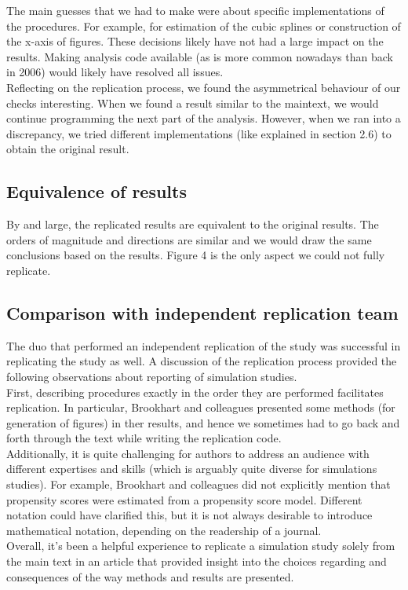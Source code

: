\documentclass[10,a4paperpaper,]{article}
\begin{document}
The main guesses that we had to make were about specific implementations
of the procedures. For example, for estimation of the cubic splines or
construction of the x-axis of figures. These decisions likely have not
had a large impact on the results. Making analysis code available (as is
more common nowadays than back in 2006) would likely have resolved all
issues.\\
Reflecting on the replication process, we found the asymmetrical
behaviour of our checks interesting. When we found a result similar to
the maintext, we would continue programming the next part of the
analysis. However, when we ran into a discrepancy, we tried different
implementations (like explained in section 2.6) to obtain the original
result.

\subsection{Equivalence of results}

By and large, the replicated results are equivalent to the original
results. The orders of magnitude and directions are similar and we would
draw the same conclusions based on the results. Figure 4 is the only
aspect we could not fully replicate.

\subsection{Comparison with independent replication team}

The duo that performed an independent replication of the study was
successful in replicating the study as well. A discussion of the
replication process provided the following observations about reporting
of simulation studies.\\
First, describing procedures exactly in the order they are performed
facilitates replication. In particular, Brookhart and colleagues
presented some methods (for generation of figures) in ther results, and
hence we sometimes had to go back and forth through the text while
writing the replication code.\\
Additionally, it is quite challenging for authors to address an audience
with different expertises and skills (which is arguably quite diverse
for simulations studies). For example, Brookhart and colleagues did not
explicitly mention that propensity scores were estimated from a
propensity score model. Different notation could have clarified this,
but it is not always desirable to introduce mathematical notation,
depending on the readership of a journal.\\
Overall, it's been a helpful experience to replicate a simulation study
solely from the main text in an article that provided insight into the
choices regarding and consequences of the way methods and results are
presented.
\end{document}
